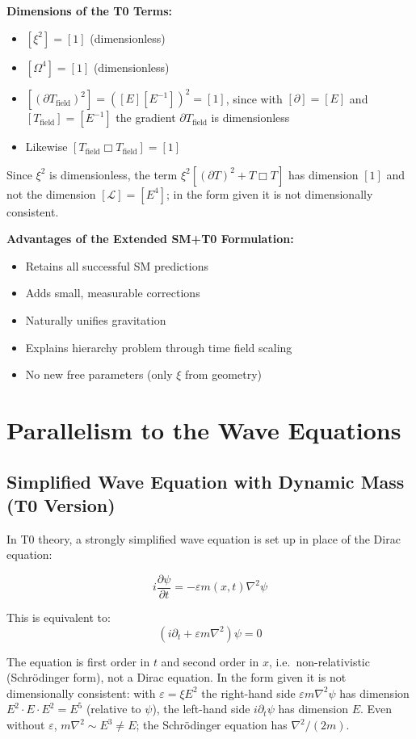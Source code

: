 	\textbf{Dimensions of the T0 Terms:}
	\begin{itemize}
		\item $[\xi^2] = [1]$ (dimensionless)
		\item $[\Omega^4] = [1]$ (dimensionless)
		\item $[(\partial T_{\text{field}})^2] = ([E][E^{-1}])^2 = [1]$, since with $[\partial] = [E]$ and $[T_{\text{field}}] = [E^{-1}]$ the gradient $\partial T_{\text{field}}$ is dimensionless
		\item Likewise $[T_{\text{field}}\Box T_{\text{field}}] = [1]$
	\end{itemize}
	Since $\xi^2$ is dimensionless, the term $\xi^2[(\partial T)^2 + T\Box T]$ has dimension $[1]$ and not the dimension $[\mathcal{L}] = [E^4]$; in the form given it is not dimensionally consistent.
	
	\textbf{Advantages of the Extended SM+T0 Formulation:}
	\begin{itemize}
		\item Retains all successful SM predictions
		\item Adds small, measurable corrections
		\item Naturally unifies gravitation
		\item Explains hierarchy problem through time field scaling
		\item No new free parameters (only $\xi$ from geometry)
	\end{itemize}
	
	\section{Parallelism to the Wave Equations}
	
	\subsection{Simplified Wave Equation with Dynamic Mass (T0 Version)}
	
	In T0 theory, a strongly simplified wave equation is set up in place of the Dirac equation:
	
	\begin{t0box}
		\begin{equation}
			i\frac{\partial\psi}{\partial t} = -\varepsilon m(x,t) \nabla^2 \psi
		\end{equation}
		
		This is equivalent to:
		\begin{equation}
			(i\partial_t + \varepsilon m \nabla^2)\psi = 0
		\end{equation}
	\end{t0box}
	The equation is first order in $t$ and second order in $x$, i.e.\ non-relativistic (Schrödinger form), not a Dirac equation. In the form given it is not dimensionally consistent: with $\varepsilon = \xi E^2$ the right-hand side $\varepsilon m \nabla^2\psi$ has dimension $E^2 \cdot E \cdot E^2 = E^5$ (relative to $\psi$), the left-hand side $i\partial_t\psi$ has dimension $E$. Even without $\varepsilon$, $m\nabla^2 \sim E^3 \neq E$; the Schrödinger equation has $\nabla^2/(2m)$.
	
